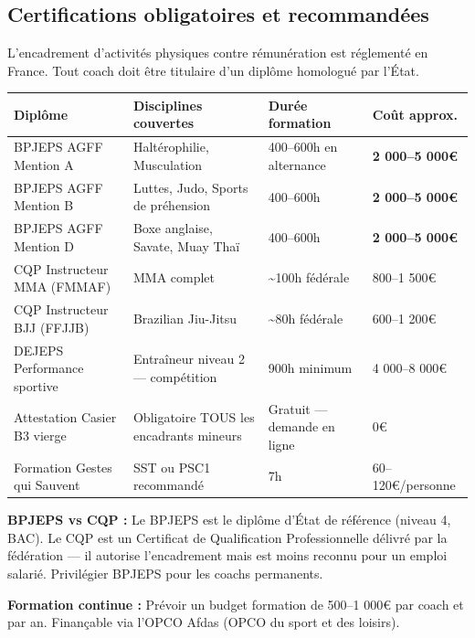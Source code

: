 \documentclass[11pt, a4paper]{article}
\newcommand{\redcell}[1]{\textcolor{fc-red}{\textbf{#1}}}
\newcommand{\posnum}[1]{\textcolor{green!60!black}{#1}}
\begin{document}
\subsection{Certifications obligatoires et recommandées}

L'encadrement d'activités physiques contre rémunération est réglementé en France. Tout coach doit être titulaire d'un diplôme homologué par l'État.

\begin{center}
\begin{tabular}{@{}p{3.5cm}p{3cm}p{2.5cm}p{3.5cm}@{}}
\toprule
\rowcolor{fc-ink}\color{white}\textbf{Diplôme} & \color{white}\textbf{Disciplines couvertes} & \color{white}\textbf{Durée formation} & \color{white}\textbf{Coût approx.} \\
\midrule
BPJEPS AGFF Mention A & Haltérophilie, Musculation & 400–600h en alternance & \redcell{2 000–5 000€} \\
\rowcolor{fc-bg2} BPJEPS AGFF Mention B & Luttes, Judo, Sports de préhension & 400–600h & \redcell{2 000–5 000€} \\
BPJEPS AGFF Mention D & Boxe anglaise, Savate, Muay Thaï & 400–600h & \redcell{2 000–5 000€} \\
\rowcolor{fc-bg2} CQP Instructeur MMA (FMMAF) & MMA complet & \textasciitilde100h fédérale & 800–1 500€ \\
CQP Instructeur BJJ (FFJJB) & Brazilian Jiu-Jitsu & \textasciitilde80h fédérale & 600–1 200€ \\
\rowcolor{fc-bg2} DEJEPS Performance sportive & Entraîneur niveau 2 — compétition & 900h minimum & 4 000–8 000€ \\
Attestation Casier B3 vierge & Obligatoire TOUS les encadrants mineurs & Gratuit — demande en ligne & \posnum{0€} \\
\rowcolor{fc-bg2} Formation Gestes qui Sauvent & SST ou PSC1 recommandé & 7h & 60–120€/personne \\
\bottomrule
\end{tabular}
\end{center}

\textbf{BPJEPS vs CQP :} Le BPJEPS est le diplôme d'État de référence (niveau 4, BAC). Le CQP est un Certificat de Qualification Professionnelle délivré par la fédération — il autorise l'encadrement mais est moins reconnu pour un emploi salarié. Privilégier BPJEPS pour les coachs permanents.

\textbf{Formation continue :} Prévoir un budget formation de 500–1 000€ par coach et par an. Finançable via l'OPCO Afdas (OPCO du sport et des loisirs).
\end{document}
